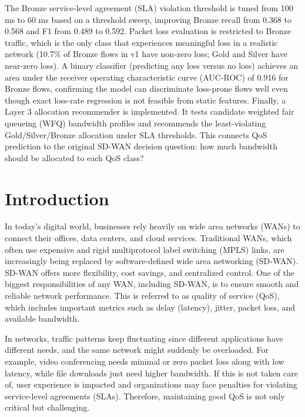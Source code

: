 \documentclass[a4paper,12pt]{Classes/RoboticsLaTeX}
\begin{document}
\begin{abstracts}
The Bronze service-level agreement (SLA) violation threshold is tuned from 100 ms to 60 ms based on a threshold sweep, improving Bronze recall from 0.368 to 0.568 and F1 from 0.489 to 0.592. Packet loss evaluation is restricted to Bronze traffic, which is the only class that experiences meaningful loss in a realistic network (10.7\% of Bronze flows in v1 have non-zero loss; Gold and Silver have near-zero loss). A binary classifier (predicting any loss versus no loss) achieves an area under the receiver operating characteristic curve (AUC-ROC) of 0.916 for Bronze flows, confirming the model can discriminate loss-prone flows well even though exact loss-rate regression is not feasible from static features. Finally, a Layer 3 allocation recommender is implemented. It tests candidate weighted fair queueing (WFQ) bandwidth profiles and recommends the least-violating Gold/Silver/Bronze allocation under SLA thresholds. This connects QoS prediction to the original SD-WAN decision question: how much bandwidth should be allocated to each QoS class?
	\end{abstracts}
	
	\tableofcontents
	\listoffigures
	\listoftables
		
	
	\mainmatter
	
	
	\chapter{Introduction}
	\label{chap:introduction}

    In today’s digital world, businesses rely heavily on wide area networks (WANs) to connect their offices, data centers, and cloud services. Traditional WANs, which often use expensive and rigid multiprotocol label switching (MPLS) links, are increasingly being replaced by software-defined wide area networking (SD-WAN). SD-WAN offers more flexibility, cost savings, and centralized control. One of the biggest responsibilities of any WAN, including SD-WAN, is to ensure smooth and reliable network performance. This is referred to as quality of service (QoS), which includes important metrics such as delay (latency), jitter, packet loss, and available bandwidth.

    In networks, traffic patterns keep fluctuating since different applications have different needs, and the same network might suddenly be overloaded. For example, video conferencing needs minimal or zero packet loss along with low latency, while file downloads just need higher bandwidth. If this is not taken care of, user experience is impacted and organizations may face penalties for violating service-level agreements (SLAs). Therefore, maintaining good QoS is not only critical but challenging.
\end{document}
